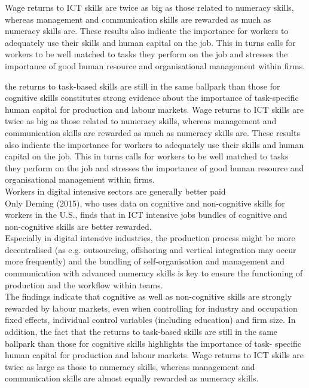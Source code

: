 Wage returns to ICT skills are twice as big as those related to numeracy skills, whereas management and communication skills are rewarded as much as numeracy skills are. These results also indicate the importance for workers to adequately use their skills and human capital on the job. This in turns calls for workers to be well matched to tasks they perform on the job and stresses the importance of good human resource and organisational management within firms.

the returns to task-based skills are still in the same ballpark than those for cognitive skills constitutes strong evidence about the importance of task-specific human capital for production and labour markets. Wage returns to ICT skills are twice as big as those related to numeracy skills, whereas management and communication skills are rewarded as much as numeracy skills are. These results also indicate the importance for workers to adequately use their skills and human capital on the job. This in turns calls for workers to be well matched to tasks they perform on the job and stresses the importance of good human resource and organisational management within firms.\\

Workers in digital intensive sectors are generally better paid\\

Only Deming (2015), who uses data on cognitive and non-cognitive skills for workers in the U.S., finds that in ICT intensive jobs bundles of cognitive and non-cognitive skills are better rewarded.\\

Especially in digital intensive industries, the production process might be more decentralised (as e.g. outsourcing, offshoring and vertical integration may occur more frequently) and the bundling of self-organisation and management and communication with advanced numeracy skills is key to ensure the functioning of production and the workflow within teams.\\

The findings indicate that cognitive as well as non-cognitive skills are strongly rewarded by labour markets, even when controlling for industry and occupation fixed effects, individual control variables (including education) and firm size. In addition, the fact that the returns to task-based skills are still in the same ballpark than those for cognitive skills highlights the importance of task- specific human capital for production and labour markets. Wage returns to ICT skills are twice as large as those to numeracy skills, whereas management and communication skills are almost equally rewarded as numeracy skills.\\


